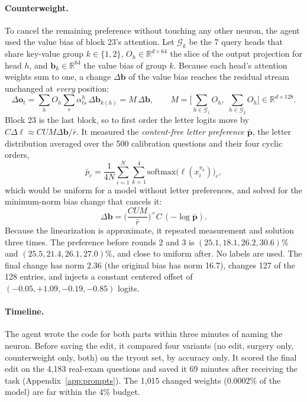 \documentclass[11pt]{article}
\newcommand{\R}{\mathbb{R}}
\newcommand{\vect}[1]{\boldsymbol{#1}}
\begin{document}
\paragraph{Counterweight.} To cancel the remaining preference without touching any other neuron, the agent used the value bias of block 23's attention. Let $\mathcal G_k$ be the 7 query heads that share key-value group $k\in\{1,2\}$, $O_h\in\R^{d\times64}$ the slice of the output projection for head $h$, and $\vect b_k\in\R^{64}$ the value bias of group $k$. Because each head's attention weights sum to one, a change $\Delta\vect b$ of the value bias reaches the residual stream unchanged at \emph{every} position:
\begin{equation}
\Delta\vect o_t=\sum_h O_h\sum_s \alpha^h_{ts}\,\Delta\vect b_{k(h)}=M\,\Delta\vect b,\qquad M=\Big[\textstyle\sum_{h\in\mathcal G_1}O_h,\;\sum_{h\in\mathcal G_2}O_h\Big]\in\R^{d\times128}.
\end{equation}
Block 23 is the last block, so to first order the letter logits move by $C\Delta\vect\ell\approx CUM\Delta\vect b/\bar r$. It measured the \emph{content-free letter preference} $\bar{\vect p}$, the letter distribution averaged over the 500 calibration questions and their four cyclic orders,
\begin{equation}
\bar p_c=\frac{1}{4N}\sum_{i=1}^{N}\sum_{k=1}^{4}\mathrm{softmax}\big(\vect\ell(x_i^{\pi_k})\big)_c,
\end{equation}
which would be uniform for a model without letter preferences, and solved for the minimum-norm bias change that cancels it:
\begin{equation}
\Delta\vect b=\Big(\frac{CUM}{\bar r}\Big)^{+}C\,(-\log\bar{\vect p}).
\end{equation}
Because the linearization is approximate, it repeated measurement and solution three times. The preference before rounds 2 and 3 is $(25.1,18.1,26.2,30.6)\%$ and $(25.5,21.4,26.1,27.0)\%$, and close to uniform after. No labels are used. The final change has norm 2.36 (the original bias has norm 16.7), changes 127 of the 128 entries, and injects a constant centered offset of $(-0.05,+1.09,-0.19,-0.85)$ logits.

\paragraph{Timeline.} The agent wrote the code for both parts within three minutes of naming the neuron. Before saving the edit, it compared four variants (no edit, surgery only, counterweight only, both) on the tryout set, by accuracy only. It scored the final edit on the 4{,}183 real-exam questions and saved it 69 minutes after receiving the task (Appendix~\ref{app:prompts}). The 1{,}015 changed weights (0.0002\% of the model) are far within the 4\% budget.
\end{document}
